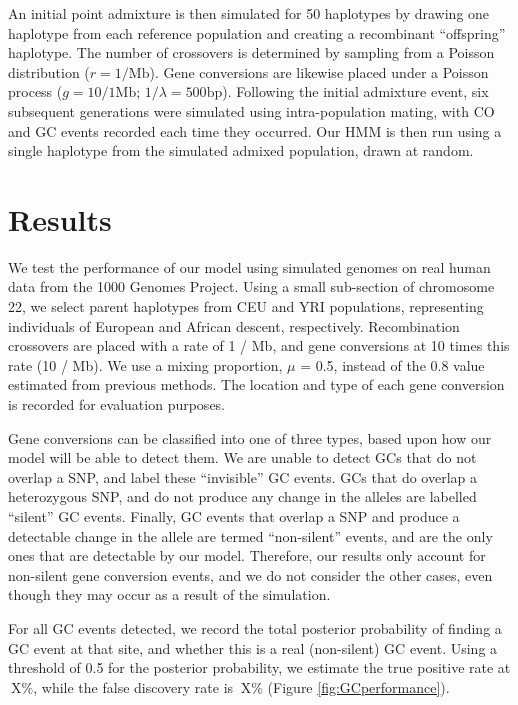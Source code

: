 An initial point admixture is then simulated for 50 haplotypes by drawing one haplotype from each reference population and creating a recombinant ``offspring'' haplotype.
The number of crossovers is determined by sampling from a Poisson distribution ($r = 1 / \mathrm{Mb}$).
Gene conversions are likewise placed under a Poisson process ($g = 10/1 \mathrm{Mb}$; $1/\lambda = 500 \mathrm{bp}$).
Following the initial admixture event, six subsequent generations were simulated using intra-population mating, with CO and GC events recorded each time they occurred. 
Our HMM is then run using a single haplotype from the simulated admixed population, drawn at random.


\section{Results}


We test the performance of our model using simulated genomes on real human data from the 1000 Genomes Project\cite{1000G2015}.
Using a small sub-section of chromosome 22, we select parent haplotypes from CEU and YRI populations, representing individuals of European and African descent, respectively.
Recombination crossovers are placed with a rate of 1 / Mb, and gene conversions at 10 times this rate (10 / Mb).
We use a mixing proportion, $\mu$ = 0.5, instead of the 0.8 value estimated from previous methods\cite{Price2009}.
The location and type of each gene conversion is recorded for evaluation purposes.

Gene conversions can be classified into one of three types, based upon how our model will be able to detect them.
We are unable to detect GCs that do not overlap a SNP, and label these ``invisible'' GC events.
GCs that do overlap a heterozygous SNP, and do not produce any change in the alleles are labelled ``silent'' GC events.
Finally, GC events that overlap a SNP and produce a detectable change in the allele are termed ``non-silent'' events, and are the only ones that are detectable by our model.
Therefore, our results only account for non-silent gene conversion events, and we do not consider the other cases, even though they may occur as a result of the simulation.


For all GC events detected, we record the total posterior probability of finding a GC event at that site, and whether this is a real (non-silent) GC event.
Using a threshold of 0.5 for the posterior probability, we estimate the true positive rate at $~$X\%, while the false discovery rate is $~$X\% (Figure \ref{fig:GCperformance}).


